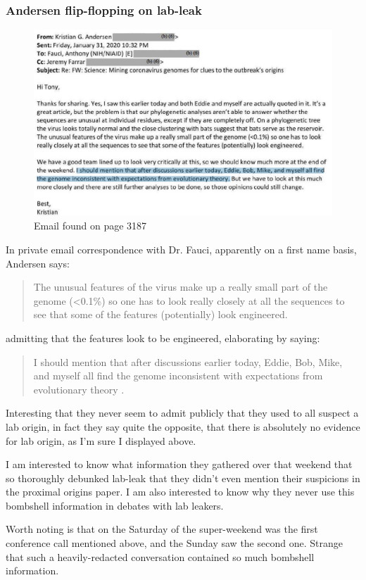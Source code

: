 \documentclass[11pt]{article}
\begin{document}
\subsubsection{Andersen flip-flopping on lab-leak}
\label{sec:org870d01d}
\begin{figure}[htbp]
\centering
\includegraphics[width=.9\linewidth]{./images/email-andersen-says-lab-leak.png}
\caption{Email found on page 3187}
\end{figure}
In private email correspondence with Dr. Fauci, apparently on a first name basis, Andersen says:
\begin{quote}
The unusual features of the virus make up a really small part of the genome (<0.1\%) so one has to look really closely at all the sequences to see that some of the features (potentially) look engineered.
\end{quote}
admitting that the features look to be engineered, elaborating by saying:
\begin{quote}
I should mention that after discussions earlier today, Eddie, Bob, Mike, and myself all find the genome inconsistent with expectations from evolutionary theory .
\end{quote}
Interesting that they never seem to admit publicly that they used to all suspect a lab origin, in fact they say quite the opposite, that there is absolutely no evidence for lab origin, as I'm sure I displayed above.

I am interested to know what information they gathered over that weekend that so thoroughly debunked lab-leak that they didn't even mention their suspicions in the proximal origins paper. I am also interested to know why they never use this bombshell information in debates with lab leakers.

Worth noting is that on the Saturday of the super-weekend was the first conference call mentioned above, and the Sunday saw the second one. Strange that such a heavily-redacted conversation contained so much bombshell information.
\end{document}

